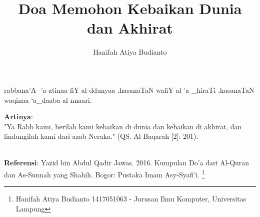 \documentclass[a4paper,12pt]{article}
\title{\Large Doa Memohon Kebaikan Dunia dan Akhirat}
\author{\calligra Hanifah Atiya Budianto}
\begin{document}
\sffamily
\maketitle 
\fullvocalize
{}
\begin{arabtext}
\noindent
rabbana'A -'a-atinaa fiY al-ddunyaa .hasanaTaN wafiY al-'a _hiraTi .hasanaTaN 
waqinaa `a_daaba al-nnaari.\\
\end{arabtext}
\noindent
\textbf{Artinya}:\\
\indent
"Ya Rabb kami, berilah kami kebaikan di dunia dan kebaikan di akhirat, dan 
lindungilah kami dari azab Neraka." (QS. Al-Baqarah [2]: 201).\\\\
\par
\noindent
\textbf{Referensi}: Yazid bin Abdul Qadir Jawas. 2016. Kumpulan Do'a dari
Al-Quran dan As-Sunnah yang Shahih. Bogor: Pustaka Imam Asy-Syafi'i.
\footnote{Hanifah Atiya Budianto 1417051063 - Jurusan Ilmu Komputer,
Universitas Lampung}
\end{document}
